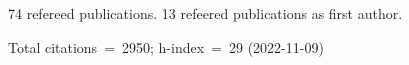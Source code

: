 74 refereed publications. 13 refeered publications as first author.

Total citations~=~2950; h-index~=~29 (2022-11-09)